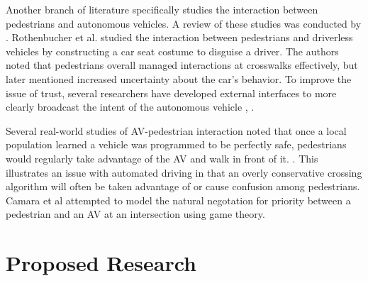 \documentclass[11pt]{article}
\begin{document}
Another branch of literature specifically studies the interaction between pedestrians and autonomous vehicles. A review of these studies was conducted by \cite{Rasouli}. Rothenbucher et al. \cite{Rothenbucher2016} studied the interaction between pedestrians and driverless vehicles by constructing a car seat costume to disguise a driver. The authors noted that pedestrians overall managed interactions at crosswalks effectively, but later mentioned increased uncertainty about the car's behavior. To improve the issue of trust, several researchers have developed external interfaces to more clearly broadcast the intent of the autonomous vehicle \cite{Matthews}, \cite{Lagstrom2015}. 

Several real-world studies of AV-pedestrian interaction noted that once a local population learned a vehicle was programmed to be perfectly safe, pedestrians would regularly take advantage of the AV and walk in front of it. \cite{Madigan}. This illustrates an issue with automated driving in that an overly conservative crossing algorithm will often be taken advantage of or cause confusion among pedestrians. Camara et al \cite{Camara2018} attempted to model the natural negotation for priority between a pedestrian and an AV at an intersection using game theory.  


\section{Proposed Research}




\end{document}
